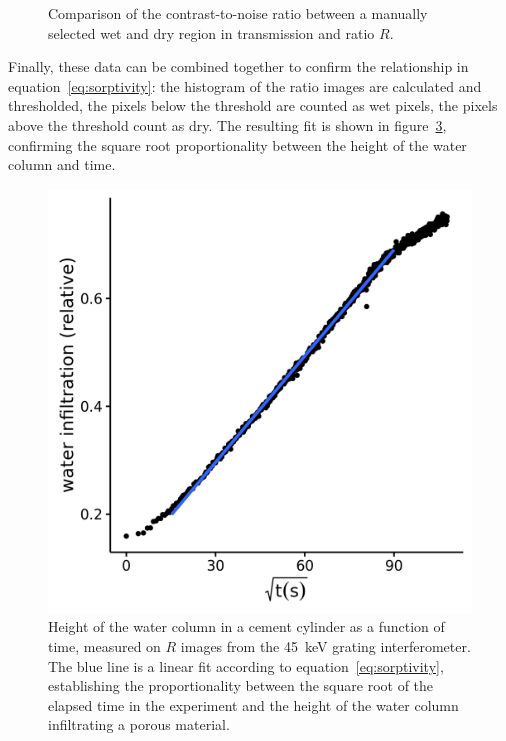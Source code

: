 \begin{figure}[htb]
\begin{subfigure}[b]{.49\textwidth}
    \caption{}
    \label{fig:wet-cement-cnr-ratio}
    \end{subfigure}
    \caption[CNR for water in cement.]{Comparison of the contrast-to-noise
    ratio between a manually selected wet and dry region in transmission and
ratio $R$.}
\label{fig:wet-cement-cnr}
\end{figure}

Finally, these data can be combined together to confirm the relationship in
equation~\eqref{eq:sorptivity}: the histogram of the ratio images are
calculated and thresholded, the pixels below the threshold are
counted as wet pixels, the pixels above the threshold count as dry. The
resulting fit is shown in figure~\ref{fig:position}, confirming the
square root proportionality between the height of the water column and time.

\begin{figure}[htb]
    \centering
    \includegraphics[width=\textwidth]{gfx/wet-cement/position.png}
    \caption{Height of the water column in a cement cylinder as a function
        of time, measured on $R$ images from the \SI{45}{\kilo\eV} grating
    interferometer. The blue line is a linear fit according to
    equation~\eqref{eq:sorptivity}, establishing the proportionality between
the square root of the elapsed time in the experiment and the height of the
water column infiltrating a porous material.}
    \label{fig:position}
\end{figure}
